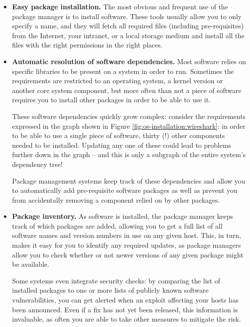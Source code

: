 \begin{itemize}
	\item {\bf Easy package installation.} The most obvious and
		frequent use of the package manager is to install
		software.  These tools usually allow you to only specify a
		name, and they will fetch all required files (including
		pre-requisites) from the Internet, your intranet, or a
		local storage medium and install all the files with the
		right permissions in the right places.

	\item {\bf Automatic resolution of software dependencies.}
		Most software relies on specific libraries to be present
		on a system in order to run.  Sometimes the requirements
		are restricted to an operating system, a kernel version or
		another core system component, but more often than not a
		piece of software requires you to install other packages
		in order to be able to use it.

		These software dependencies quickly grow complex: consider
		the requirements expressed in the graph shown in Figure
		\ref{fig:os-installation:wireshark}: in order to be able to
		use a single piece of software, thirty (!) other components
		needed to be installed.  Updating any one of these could
		lead to problems further down in the graph -- and this is
		only a subgraph of the entire system's dependency tree!

		Package management systems keep track of these
		dependencies and allow you to automatically add
		pre-requisite software packages as well as prevent you
		from accidentally removing a component relied on by other
		packages.

	\item {\bf Package inventory.}  As software is installed, the
		package manager keeps track of which packages are added,
		allowing you to get a full list of all software names and
		version numbers in use on any given host.  This, in turn,
		makes it easy for you to identify any required updates, as
		package managers allow you to check whether or not newer
		versions of any given package might be available.

		Some systems even integrate security checks: by comparing
		the list of installed packages to one or more lists of publicly
		known software vulnerabilities, you can get alerted when
		an exploit affecting your hosts has been announced.  Even
		if a fix has not yet been released, this information is
		invaluable, as often you are able to take other measures
		to mitigate the risk.


\end{itemize}
